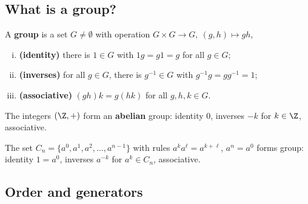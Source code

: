 \subsection{What is a group?}

\begin{slide}
    \begin{definition}[group]
        \vspace{0pt}
        A \textbf{group} is a set $G \neq \emptyset$ with operation $G \times G \to G,\ (g,h) \mapsto gh$, \pause

        \begin{enumerate}[(i)]
            \item \textbf{(identity)} there is $1 \in G$ with $1g = g1 = g$ for all $g \in G$; \pause
            \item \textbf{(inverses)} for all $g \in G$, there is $g^{-1} \in G$ with $g^{-1}g = gg^{-1} = 1$; \pause
            \item \textbf{(associative)} $(gh)k = g(hk)$ for all $g,h,k \in G$.
        \end{enumerate}
    \end{definition} \pause

    \begin{example}
        \vspace{0pt}
        The integers $(\Z,+)$ form an \textbf{abelian} group: identity \pause $0$, inverses \pause $-k$ for $k \in \Z$, associative.
    \end{example} \pause

    \begin{example}
        \vspace{0pt}
        The set $C_n = \{a^0,a^1,a^2,\dotsc,a^{n-1}\}$ with rules $a^ka^\ell = a^{k+\ell}$, $a^n = a^0$ forms group: identity \pause $1 = a^0$, inverses \pause $a^{-k}$ for $a^k \in C_n$, associative.
    \end{example}
\end{slide}

\subsection{Order and generators}

